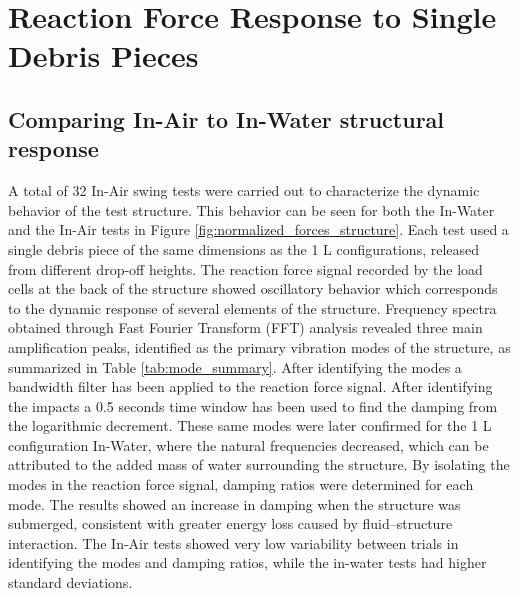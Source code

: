 \documentclass{article}
\begin{document}
{\begin{figure}[htbp]
\end{figure}

\section{Reaction Force Response to Single Debris Pieces} 
\subsection{Comparing In-Air to In-Water structural response} 
A total of 32 In-Air swing tests were carried out to characterize the dynamic behavior of the test structure. This behavior can be seen for both the In-Water and the In-Air tests in Figure \ref{fig:normalized_forces_structure}. Each test used a single debris piece of the same dimensions as the 1 L configurations, released from different drop-off heights. The reaction force signal recorded by the load cells at the back of the structure showed oscillatory behavior which corresponds to the dynamic response of several elements of the structure. Frequency spectra obtained through Fast Fourier Transform (FFT) analysis revealed three main amplification peaks, identified as the primary vibration modes of the structure, as summarized in Table \ref{tab:mode_summary}. After identifying the modes a bandwidth filter has been applied to the reaction force signal. After identifying the impacts a 0.5 seconds time window has been used to find the damping from the logarithmic decrement. These same modes were later confirmed for the 1 L configuration In-Water, where the natural frequencies decreased, which can be attributed to the added mass of water surrounding the structure. By isolating the modes in the reaction force signal, damping ratios were determined for each mode. The results showed an increase in damping when the structure was submerged, consistent with greater energy loss caused by fluid–structure interaction. The In-Air tests showed very low variability between trials in identifying the modes and damping ratios, while the in-water tests had higher standard deviations.


}
\end{document}
